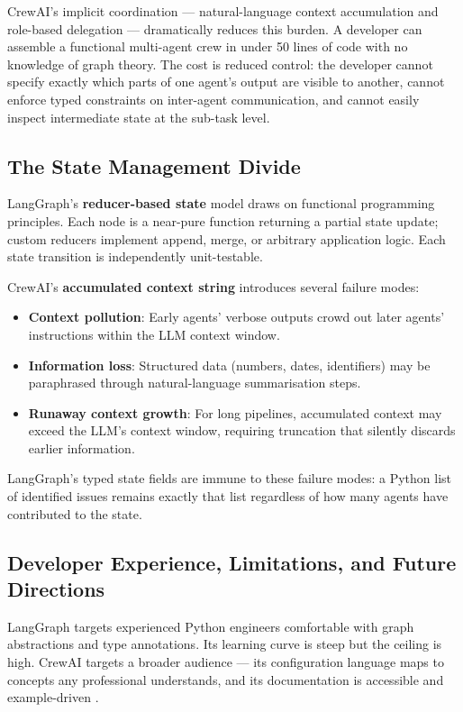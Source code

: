 \documentclass[12pt,a4paper]{article}
\begin{document}
CrewAI's implicit coordination --- natural-language context accumulation and
role-based delegation --- dramatically reduces this burden. A developer can
assemble a functional multi-agent crew in under 50 lines of code with no
knowledge of graph theory. The cost is reduced control: the developer cannot
specify exactly which parts of one agent's output are visible to another,
cannot enforce typed constraints on inter-agent communication, and cannot easily
inspect intermediate state at the sub-task level.

\subsection{The State Management Divide}

LangGraph's \textbf{reducer-based state} model draws on functional programming
principles. Each node is a near-pure function returning a partial state update;
custom reducers implement append, merge, or arbitrary application logic. Each
state transition is independently unit-testable.

CrewAI's \textbf{accumulated context string} introduces several failure modes:

\begin{itemize}
    \item \textbf{Context pollution}: Early agents' verbose outputs crowd out
          later agents' instructions within the LLM context window.
    \item \textbf{Information loss}: Structured data (numbers, dates,
          identifiers) may be paraphrased through natural-language
          summarisation steps.
    \item \textbf{Runaway context growth}: For long pipelines, accumulated
          context may exceed the LLM's context window, requiring truncation
          that silently discards earlier information.
\end{itemize}

LangGraph's typed state fields are immune to these failure modes: a Python list
of identified issues remains exactly that list regardless of how many agents
have contributed to the state.

\subsection{Developer Experience, Limitations, and Future Directions}

LangGraph targets experienced Python engineers comfortable with graph
abstractions and type annotations. Its learning curve is steep but the ceiling
is high. CrewAI targets a broader audience --- its configuration language maps
to concepts any professional understands, and its documentation is accessible
and example-driven \cite{Rogers2023Survey}.
\end{document}
